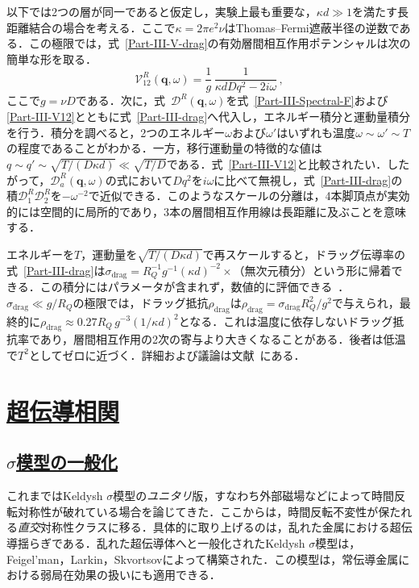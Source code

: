 \documentclass[a4paper,11pt]{ltjsarticle}
\newcommand{\sectionlink}[1]{\section[#1]{\hyperlink{toc}{#1}}}
\newcommand{\subsectionlink}[1]{\subsection[#1]{\hyperlink{toc}{#1}}}
\def\qo{(\mathbf{q},\omega)}
\begin{document}
以下では2つの層が同一であると仮定し，実験上最も重要な，$\kappa d\gg 1$を満たす長距離結合の場合を考える．ここで$\kappa=2\pi e^2\nu$はThomas--Fermi遮蔽半径の逆数である．この極限では，式~\eqref{Part-III-V-drag}の有効層間相互作用ポテンシャルは次の簡単な形を取る．
\begin{equation}\label{Part-III-V12}
\mathcal{V}_{12}^R\qo=\frac{1}{g}\, \frac{1}{\kappa d
Dq^{2}-2i\omega}\,,
\end{equation}
ここで$g=\nu D$である．次に，式~$\mathcal{D}^{R}\qo$を式~\eqref{Part-III-Spectral-F}および\eqref{Part-III-V12}とともに式~\eqref{Part-III-drag}へ代入し，エネルギー積分と運動量積分を行う．積分を調べると，2つのエネルギー$\omega$および$\omega'$はいずれも温度$\omega\sim\omega'\sim T$の程度であることがわかる．一方，移行運動量の特徴的な値は$q\sim q'\sim \sqrt{T/(D\kappa
d)}\ll \sqrt{T/D}$である．式~\eqref{Part-III-V12}と比較されたい．したがって，${\mathcal D}_{a}^R\qo$の式において$Dq^2$を$i\omega$に比べて無視し，式~\eqref{Part-III-drag}の積${\mathcal
D}_1^R{\mathcal D}_2^R$を$-\omega^{-2}$で近似できる．このようなスケールの分離は，4本脚頂点が実効的には空間的に局所的であり，3本の層間相互作用線は長距離に及ぶことを意味する．

エネルギーを$T$，運動量を$\sqrt{T/(D\kappa d)}$で再スケールすると，ドラッグ伝導率の式~\eqref{Part-III-drag}は$\sigma_{\mathrm{drag}}= R_Q^{-1}g^{-1}(\kappa
d)^{-2}\times $（{\rm 無次元積分}）という形に帰着できる．この積分にはパラメータが含まれず，数値的に評価できる~\cite{Drag-Third-order}．$\sigma_{\mathrm{drag}}\ll g/R_Q$の極限では，ドラッグ抵抗$\rho_{\mathrm{drag}}$は$\rho_{\mathrm{drag}}=\sigma_{\mathrm{drag}}R_Q^2/g^2$で与えられ，最終的に$\rho_{\mathrm{drag}}\approx 0.27R_{Q}\,g^{-3}(1/\kappa
d)^2$となる．これは温度に依存しないドラッグ抵抗率であり，層間相互作用の2次の寄与より大きくなることがある．後者は低温で$T^2$としてゼロに近づく．詳細および議論は文献~\cite{Drag-Third-order}にある．


\sectionlink{超伝導相関}\label{sec_SuperCond}
\subsectionlink{$\sigma$模型の一般化}\label{sec_SuperCond-1}

これまではKeldysh $\sigma$模型の\emph{ユニタリ}版，すなわち外部磁場などによって時間反転対称性が破れている場合を論じてきた．ここからは，時間反転不変性が保たれる\emph{直交}対称性クラスに移る．具体的に取り上げるのは，乱れた金属における超伝導揺らぎである．乱れた超伝導体へと一般化されたKeldysh $\sigma$模型は，Feigel'man，Larkin，Skvortsovによって構築された\cite{Feigel'manLarkinSkvortsov,SkvortsovLarkinFeigel'man}．この模型は，常伝導金属における弱局在効果の扱いにも適用できる．
\end{document}
